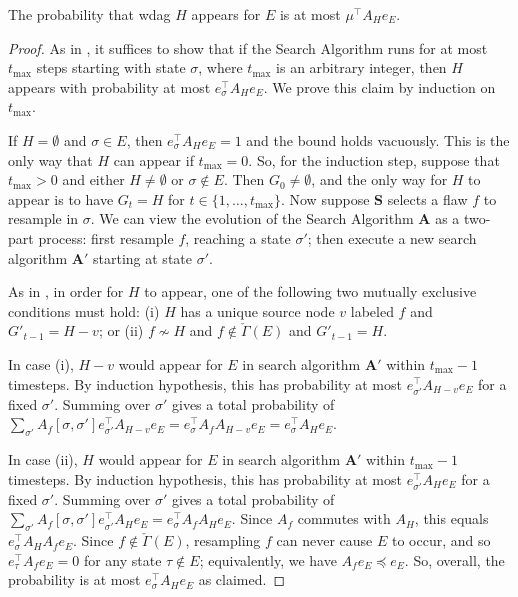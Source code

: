 \documentclass{toc}
\begin{document}
\begin{lemma}
  \label{witness-tree-lemma_simple2}
The probability that wdag $H$ appears for $E$ is at most $\mu^{\top} A_H e_E$.
\end{lemma}
\begin{proof}
As in , it suffices to show that if the Search Algorithm runs for at most $t_{\max}$ steps starting with state $\sigma$, where $t_{\max}$ is an arbitrary integer, then $H$ appears with probability at most $e_{\sigma}^{\top} A_H e_E.$ We prove this claim by induction on $t_{\max}$. 


If $H = \emptyset$ and $\sigma \in E$, then $e_{\sigma}^{\top} A_H e_E = 1$ and the bound holds vacuously. This is the only way that $H$ can appear if $t_{\max} = 0$. So, for the induction step, suppose that $t_{\max} > 0$ and either $H \neq \emptyset$ or $\sigma \not \in E$.  Then $G_0 \neq \emptyset$, and the only way for $H$ to appear is to have $G_t = H$ for $t \in \{1, \dots,  t_{\max}  \}$. Now suppose $\mathbf S$ selects a flaw $f$ to resample in $\sigma$. We can view the evolution of the Search Algorithm $\mathbf A$ as a two-part process: first resample $f$, reaching a state $\sigma'$; then execute a new search algorithm $\mathbf A'$ starting at state $\sigma'$.

 As in , in order for $H$ to appear, one of the following two mutually exclusive conditions must hold: (i) $H$ has a unique source node $v$ labeled $f$ and $G'_{t-1} = H - v$; or  (ii) $f \not \sim H$ and $f \notin \check \Gamma(E)$ and $G'_{t-1} = H$. 

In case (i),  $H - v$ would appear for $E$ in search algorithm $\mathbf A'$ within $t_{\max}-1$ timesteps. By induction hypothesis, this has  probability at most $e_{\sigma'}^{\top} A_{H-v} e_E$ for a fixed $\sigma'$. Summing over $\sigma'$ gives a total probability of  $\sum_{\sigma'} A_f[\sigma, \sigma'] e_{\sigma'}^{\top} A_{H-v} e_E = e_{\sigma}^{\top} A_f  A_{H-v} e_E = e_{\sigma}^{\top} A_H e_E$.

In case (ii),  $H $ would appear for $E$ in search algorithm $\mathbf A'$ within $t_{\max}-1$ timesteps. By induction hypothesis, this has  probability at most $e_{\sigma'}^{\top} A_H e_E$ for a fixed $\sigma'$. Summing over $\sigma'$ gives a total probability of  $\sum_{\sigma'} A_f[\sigma, \sigma'] e_{\sigma'}^{\top} A_{H} e_E = e_{\sigma}^{\top} A_f  A_{H} e_E$. Since $A_f$ commutes with $A_H$, this equals $e_{\sigma}^{\top} A_{H} A_f e_E$. Since $f \notin \check \Gamma(E)$, resampling $f$ can never cause $E$ to occur, and so $e_{\tau}^{\top} A_f e_E = 0$ for any state $\tau \notin E$; equivalently, we have $A_f e_E \preceq e_E$. So, overall, the probability is at most $e_{\sigma}^{\top} A_{H} e_E$ as claimed. 
\end{proof}
\end{document}
